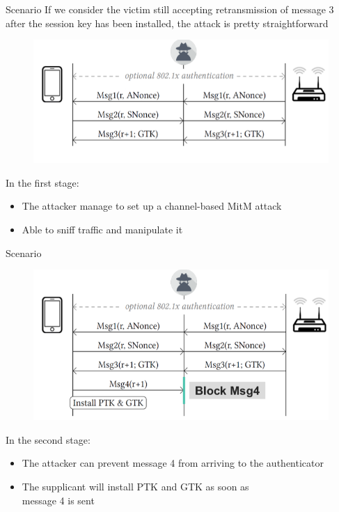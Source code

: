 \documentclass[11pt,t]{beamer}
\begin{document}
\begin{frame}[fragile]{Scenario}  
	If we consider the victim still accepting retransmission of message 3 after the session 
	key has been installed, the attack is pretty straightforward

	\begin{figure}[tbh]
		\centering
		\includegraphics[width=0.6\linewidth]{graphics/krack/k1.png}
		\label{fig:k1}
	  \end{figure}

	In the first stage:
	\begin{itemize}
	\item The attacker manage to set up a channel-based MitM attack
	\item Able to sniff traffic and manipulate it
	\end{itemize}

\sed
\end{frame}

\begin{frame}[fragile]{Scenario}  

	\begin{figure}[tbh]
		\centering
		\includegraphics[width=0.7\linewidth]{graphics/krack/k2.png}
		\label{fig:k2}
	  \end{figure}

	In the second stage:
	\begin{itemize}
	\item The attacker can prevent message 4 from arriving to the authenticator
	\item The supplicant will install PTK and GTK as soon as \\message 4 is sent
	\end{itemize}

\sed
\end{frame}
\end{document}
